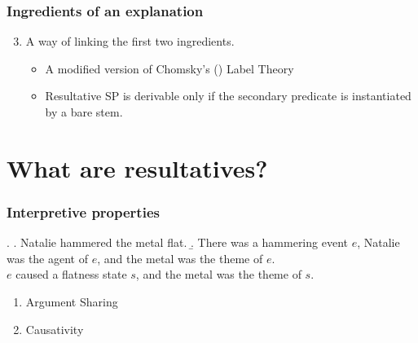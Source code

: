 \documentclass{article}
\begin{document}
\begin{frame}
  \frametitle{Ingredients of an explanation}
  \begin{enumerate}
    \setcounter{enumi}{2}  
    \item A way of linking the first two ingredients.
      \begin{itemize}
	\item A modified version of Chomsky's (\citeyear{chomsky2013problems,chomsky2015problems}) Label Theory
	\item Resultative SP is derivable only if the secondary predicate is instantiated by a bare stem.
      \end{itemize}
  \end{enumerate}
\end{frame}
\section{What are resultatives?}
\begin{frame}
  \frametitle{Interpretive properties}
  \ex.
  \a. {\rm Natalie hammered the metal flat.}
  \b. There was a hammering event $e$, Natalie was the agent of $e$, and \alert<2>{the metal} was the theme of $e$.\\
  $e$ \alert<3>{caused} a flatness state $s$, and \alert<2>{the metal} was the theme of $s$.

  \pause
  \begin{enumerate}
    \item \alert<2>{Argument Sharing}
    \item \alert<3>{Causativity}
  \end{enumerate}
\end{frame}
\end{document}
